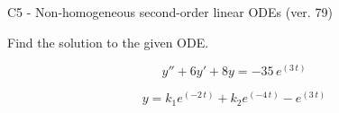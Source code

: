 \begin{exercise}
  \begin{exerciseTitle}C5 - Non-homogeneous second-order linear ODEs (ver. 79)\end{exerciseTitle}
  \begin{exerciseStatement}
    
Find the solution to the given ODE.

    
\[y''+6y'+8y = -35 \, e^{\left(3 \, t\right)}\]

  \end{exerciseStatement}
  \begin{exerciseAnswer}
    
\[y= k_{1} e^{\left(-2 \, t\right)} + k_{2} e^{\left(-4 \, t\right)} - e^{\left(3 \, t\right)}\]

  \end{exerciseAnswer}
\end{exercise}